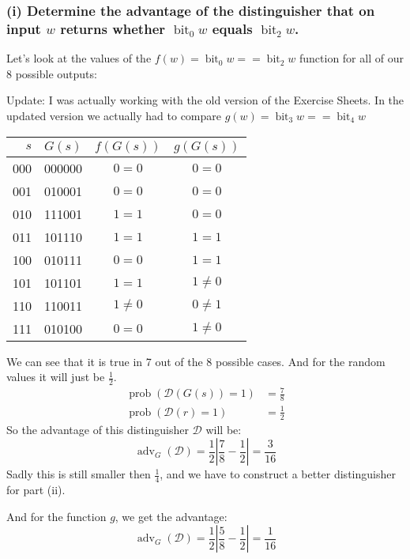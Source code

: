 \documentclass{article}
\begin{document}
  \subsubsection*{(i) Determine the advantage of the distinguisher that on input $w$ returns whether $\operatorname{bit}_0 w$ equals $\operatorname{bit}_2 w$.}
  Let's look at the values of the $f(w) = \operatorname{bit}_0 w == \operatorname{bit}_2 w$ function for all of our 8 possible outputs:

  Update: I was actually working with the old version of the Exercise Sheets.
  In the updated version we actually had to compare $g(w) = \operatorname{bit}_3 w == \operatorname{bit}_4 w$

  \begin{center}
    \begin{tabular}{r|r|c|c}
      $s$ & $G(s)$ & $f(G(s))$ & $g(G(s))$\\ \hline
      000 & 000000 & $0=0$ & $0 = 0$\\
      001 & 010001 & $0=0$ & $0 = 0$\\
      010 & 111001 & $1=1$ & $0 = 0$\\
      011 & 101110 & $1=1$ & $1 = 1$\\
      100 & 010111 & $0=0$ & $1 = 1$\\
      101 & 101101 & $1=1$ & $1 \neq 0$\\
      110 & 110011 & $1 \neq 0$ & $0 \neq 1$\\
      111 & 010100 & $0=0$ & $1 \neq 0$\\
    \end{tabular}
  \end{center}

  We can see that it is true in 7 out of the 8 possible cases. And for the random values it will just be $\frac{1}{2}$.
  \begin{align*}
    \operatorname{prob}(\mathcal{D}(G(s)) = 1) &= \frac{7}{8} \\
    \operatorname{prob}(\mathcal{D}(r) = 1) &= \frac{1}{2}
  \end{align*}
  So the advantage of this distinguisher $\mathcal{D}$ will be:
  \[ \operatorname{adv}_G(\mathcal{D}) = \frac{1}{2}\left|\frac{7}{8} - \frac{1}{2}\right| = \frac{3}{16} \]
  Sadly this is still smaller then $\frac{1}{4}$, and we have to construct a better distinguisher for part (ii).

  And for the function $g$, we get the advantage:
  \[ \operatorname{adv}_G(\mathcal{D}) = \frac{1}{2}\left|\frac{5}{8} - \frac{1}{2}\right| = \frac{1}{16} \]
\end{document}
